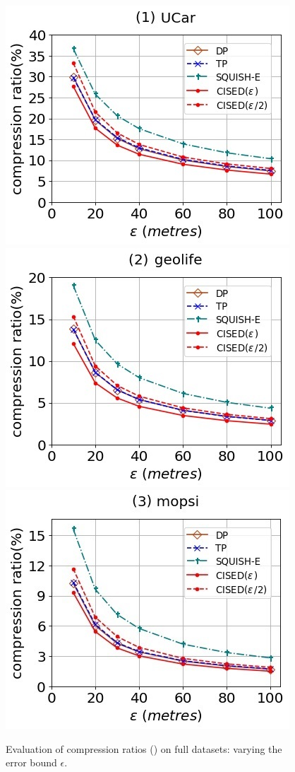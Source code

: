\begin{figure}[tb!]
	\centering
	\includegraphics[scale=0.500]{Figures/Exp-SED-CR-epsilon-service.jpg} 	\hspace{2ex}
	\includegraphics[scale=0.500]{Figures/Exp-SED-CR-epsilon-geolife.jpg}	\hspace{2ex}
	\includegraphics[scale=0.500]{Figures/Exp-SED-CR-epsilon-mopsi.jpg}		
	\vspace{-2ex}
	\caption{\small Evaluation of compression ratios (\sed) on full datasets: varying the error bound $\epsilon$.}
	\label{fig:cr-sed-epsilon}
	\vspace{-2ex}
\end{figure}

